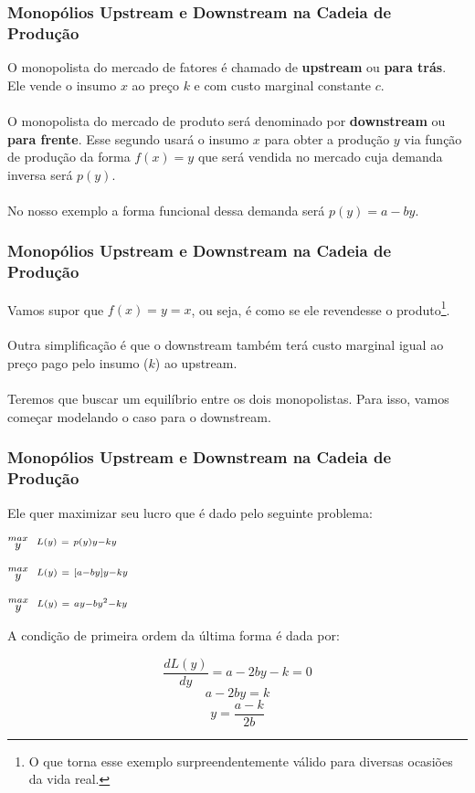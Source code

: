 \documentclass{beamer}[10]
\begin{document}
\begin{frame}
	\frametitle{Monopólios Upstream e Downstream na Cadeia de Produção}

	O monopolista do mercado de fatores é chamado de \textbf{upstream} ou \textbf{para trás}. Ele vende o insumo $x$ ao preço $k$ e com custo marginal constante $c$. 
	\\~\\
	O monopolista do mercado de produto será denominado por \textbf{downstream} ou \textbf{para frente}. Esse segundo usará o insumo $x$ para obter a produção  $y$ via função de produção da forma $f(x) = y$ que será vendida no mercado cuja demanda inversa será $p(y)$. 
	\\~\\
	No nosso exemplo a forma funcional dessa demanda será $p(y) = a - by$.

\end{frame}

\begin{frame}
	\frametitle{Monopólios Upstream e Downstream na Cadeia de Produção}

	Vamos supor que $f(x) = y = x$, ou seja, é como se ele revendesse o produto\footnote{O que torna esse exemplo surpreendentemente válido para diversas ocasiões da vida real.}. 
	\\~\\
	Outra simplificação é que o downstream também terá custo marginal igual ao preço pago pelo insumo ($k$) ao upstream.
	\\~\\
	Teremos que buscar um equilíbrio entre os dois monopolistas. Para isso, vamos começar modelando o caso para o downstream. 

\end{frame}

\begin{frame}
	\frametitle{Monopólios Upstream e Downstream na Cadeia de Produção}

	Ele quer maximizar seu lucro que é dado pelo seguinte problema:

	\begin{center}
		\Large $\stackrel{max}{\text{\small $y$}} \ \ \stackrel{L(y)\ =\ p(y)y - ky}{\ }$ \\
		\end{center}
		\begin{center}
		\Large $\stackrel{max}{\text{\small $y$}} \ \ \stackrel{L(y)\ =\ [a - by]y - ky}{\ }$ \\
		\end{center}
		\begin{center}
		\Large $\stackrel{max}{\text{\small $y$}} \ \ \stackrel{L(y)\ =\ ay - by^2 - ky}{\ }$ \\
	\end{center}

	A condição de primeira ordem da última forma é dada por:

	$$ \frac{d L(y)}{d y} = a - 2by - k = 0 $$
	$$ a - 2by = k $$
	$$ y = \frac{a - k}{2b} $$

\end{frame}
\end{document}
